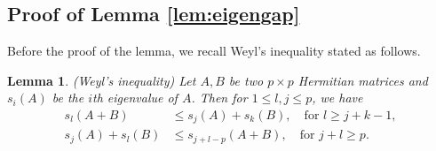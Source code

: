\documentclass[11pt]{article}
\newcommand{\nb}[1]{\textcolor{orange}{\texttt{[#1]}}}
\newcommand{\gsc}[1]{\textcolor{blue}{\texttt{[#1]}}}
\newcommand{\eigen}{s} %
\newcommand{\0}{{\mathbf{0}}}
\newtheorem{lemma}[theorem]{Lemma}
\begin{document}
\subsection{Proof of Lemma \ref{lem:eigengap}}
Before the proof of the lemma, we recall Weyl's inequality \citep{weyl1912asymptotische} stated as follows.

\begin{lemma}(Weyl's inequality)
      \label{lemma:weyl}
Let $A,B$ be two $p\times p$ Hermitian matrices {and $s_i(A)$ be the $i$th eigenvalue of $A$}. 
Then for $1\leq l,j\leq p$, we have 
\begin{align*}
\eigen_l(A+B)& \leq \eigen_j(A)+\eigen_k(B),
\quad 
\text{for $l\geq j+k-1$},\\
\eigen_j(A)+\eigen_l(B) & \leq \eigen_{j+l-p}(A+B),
\quad 
\text{for $j+l\geq p$}. 
\end{align*}
\end{lemma}
\end{document}
